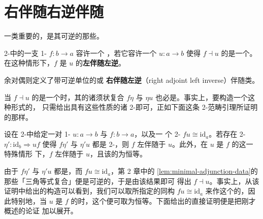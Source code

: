 
\providecommand{\hTwoCell}[5]{\tikz[baseline=-0.8ex]{%
  \node (rvl) at (0,0) {$#1$};
  \node (rvr) at (2.9,0) {$#2$};
  \draw[->] (rvl) to[bend left=28] node[above]{$\scriptstyle #3$} (rvr);
  \draw[->] (rvl) to[bend right=28] node[below]{$\scriptstyle #5$} (rvr);
  \node at (1.45,0) {$\scriptstyle #4$};}}

\section{右伴随右逆伴随}\label{sec:right-adjoint-right-inverse-adjunctions}

一类重要的\trAdjunction，是其\trCounit{}可逆的那些\trAdjunction。

\begin{definition}[右伴随右逆]\label{def:rajri}
2-\trCategory{}中的一支 1-\trCell{} $f\colon b\to a$ 容许一个%
\textbf{\trRightAdjoint\trRightInverse}，若它容许一个\trRightAdjoint{} $u\colon a\to b$
使得\trAdjunction{} $f\dashv u$ 的\trCounit{}是一个\trIsomorphism。在这种情形下，$f$ 是
$u$ 的\textbf{左伴随左逆}。
\end{definition}

余对偶则定义了带可逆单位的\textbf{\trLeftAdjoint\trRightInverse}或%
\textbf{右伴随左逆}（right adjoint left inverse）伴随类。

当 $f\dashv u$ 的\trCounit{}是一个\trIsomorphism{}时，其\trUnit{}的诸须状复合
$f\eta$ 与 $\eta u$ 也必是\trIsomorphism。事实上，要构造一个这种形式的\trAdjunction，
只需给出具有这些性质的诸 2-\trCell{}即可，正如下面这条 2-范畴引理所证明的那样。

\begin{lemma}\label{lem:rajri-modification}
设在 2-\trCategory{}中给定一对 1-\trCell{} $u\colon a\to b$ 与 $f\colon b\to a$，以及一
个 2-\trIsomorphism{} $fu\cong\mathrm{id}_{a}$。若存在 2-\trCell{}
$\eta'\colon\mathrm{id}_{b}\Rightarrow uf$ 使得 $f\eta'$ 与 $\eta'u$ 都是
2-\trIsomorphism，则 $f$ 左伴随于 $u$。此外，在 $u$ 是 $f$ 的\trSection{}这一特殊情形
下，$f$ 左伴随于 $u$，且该\trAdjunction{}的\trCounit{}为恒等。
\end{lemma}

由于 $f\eta'$ 与 $\eta'u$ 都是\trIsomorphism，而 $fu\cong\mathrm{id}_{a}$，第 2 章中的%
\cref{lem:minimal-adjunction-data}的那些「三角等式复合」便是可逆的，于是由该结果即可
得出 $f\dashv u$。事实上，从该证明中给出的构造可以看到，我们可以取所指定的同构
$fu\cong\mathrm{id}_{a}$ 来作这个\trAdjunction{}的\trCounit，因此特别地，当 $u$ 是 $f$
的\trSection{}时，这个\trCounit{}便可取为恒等。下面给出的直接证明便是把刚才概述的论证
加以展开。

